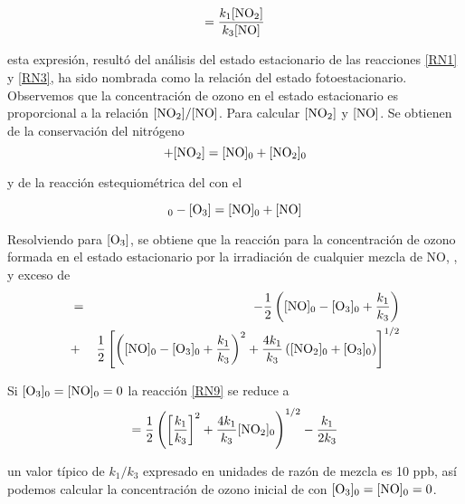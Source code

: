 \begin{equation}
[\ce{O3}]=\frac{k_1[\ce{NO2}]}{k_3[\ce{NO}]}
\label{RN8}
\end{equation}

esta expresión, resultó del análisis del estado estacionario de las reacciones \ref{RN1} y \ref{RN3}, ha sido nombrada como la relación del estado fotoestacionario. Observemos que la concentración de ozono en el estado estacionario es proporcional a la relación $[\ce{NO2}]/[\ce{NO}]$. Para calcular  $[\ce{NO2}]$ y $[\ce{NO}]$. Se obtienen de la conservación del nitrógeno
\begin{equation*}
[\ce{NO}] + [\ce{NO2}] = [\ce{NO}]_0 + [\ce{NO2}]_0
\end{equation*}

y de la reacción estequiométrica del  con el 

\begin{equation*}
[\ce{O3}]_0 - [\ce{O3}] = [\ce{NO}]_0 + [\ce{NO}]
\end{equation*}

Resolviendo para $[\ce{O3}]$, se obtiene que la reacción para la concentración de ozono formada en el estado estacionario por la irradiación de cualquier mezcla de NO, ,  y exceso de 
\begin{eqnarray}
 [\ce{O3}]&=&-\frac{1}{2}\left([\ce{NO}]_0-[\ce{O3}]_0+\frac{k_1}{k_3}\right) \nonumber\\
  &+&\frac{1}{2}\left[\left([\ce{NO}]_0-[\ce{O3}]_0+\frac{k_1}{k_3}\right)^2+\frac{4k_1}{k_3} \left([\ce{NO2}]_0+[\ce{O3}]_0\right)\right]^{1/2}
\label{RN9}
\end{eqnarray}

Si $[\ce{O3}]_0=[\ce{NO}]_0=0$ la reacción \ref{RN9} se reduce a 
\begin{equation}
 [\ce{O3}]=\frac{1}{2}\left(\left[\frac{k_1}{k_3}\right]^2+\frac{4k_1}{k_3} [\ce{NO2}]_0\right)^{1/2} -\frac{k_1}{2k_3}
\label{RN10}
\end{equation}

un valor típico de $k_1/k_3$ expresado en unidades de razón de mezcla es 10 ppb, así podemos calcular la concentración de ozono inicial de  con   $[\ce{O3}]_0=[\ce{NO}]_0=0$.

